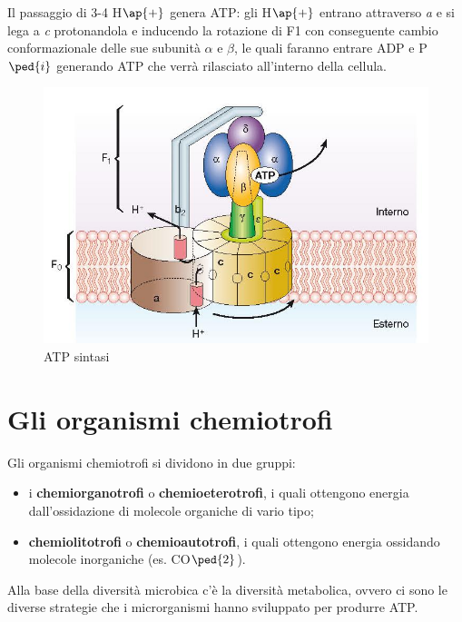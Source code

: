 \documentclass[11pt]{book}
\begin{document}
Il passaggio di 3-4 H$\ap{+}$ genera ATP: gli H$\ap{+}$ entrano attraverso \emph{a} e si lega a \emph{c} protonandola e inducendo la rotazione di F1 con conseguente cambio conformazionale delle sue subunità $\alpha$ e $\beta$, le quali faranno entrare ADP e P$\ped{i}$ generando ATP che verrà rilasciato all'interno della cellula.

\clearpage
\begin{figure}[htp]
\centering
\includegraphics[scale=0.5]{img/ATP sintasi.png}
\caption{ATP sintasi}
\label{}
\end{figure}


\section{Gli organismi chemiotrofi}
Gli organismi chemiotrofi si dividono in due gruppi:
\begin{itemize}
\item i \textbf{chemiorganotrofi} o \textbf{chemioeterotrofi}, i quali ottengono energia dall’ossidazione di molecole organiche di vario tipo;
\item \textbf{chemiolitotrofi} o \textbf{chemioautotrofi}, i quali ottengono energia ossidando molecole inorganiche (es. CO$\ped{2}$).
\end{itemize}

\vspace{1em}
Alla base della diversità microbica c'è la diversità metabolica, ovvero ci sono le diverse strategie che i microrganismi hanno sviluppato per produrre ATP.
\end{document}
